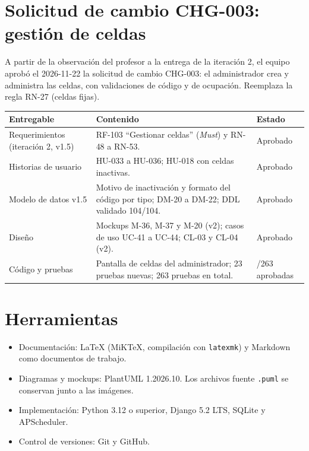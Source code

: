 \section{Solicitud de cambio CHG-003: gestión de celdas}
A partir de la observación del profesor a la entrega de la iteración 2, el equipo aprobó el 2026-11-22 la solicitud de cambio CHG-003: el administrador crea y administra las celdas, con validaciones de código y de ocupación. Reemplaza la regla RN-27 (celdas fijas).
\begin{longtable}{>{\raggedright\arraybackslash}p{5.2cm}>{\raggedright\arraybackslash}p{6.6cm}>{\raggedright\arraybackslash}p{2.6cm}}
\toprule
\textbf{Entregable} & \textbf{Contenido} & \textbf{Estado}\\
\midrule\endhead
Requerimientos (iteración 2, v1.5) & RF-103 ``Gestionar celdas'' (\textit{Must}) y RN-48 a RN-53. & Aprobado\\
Historias de usuario & HU-033 a HU-036; HU-018 con celdas inactivas. & Aprobado\\
Modelo de datos v1.5 & Motivo de inactivación y formato del código por tipo; DM-20 a DM-22; DDL validado 104/104. & Aprobado\\
Diseño & Mockups M-36, M-37 y M-20 (v2); casos de uso UC-41 a UC-44; CL-03 y CL-04 (v2). & Aprobado\\
Código y pruebas & Pantalla de celdas del administrador; 23 pruebas nuevas; 263 pruebas en total. & 263/263 aprobadas\\
\bottomrule
\end{longtable}

\section{Herramientas}
\begin{itemize}
  \item Documentación: \LaTeX{} (MiKTeX, compilación con \texttt{latexmk}) y Markdown como documentos de trabajo.
  \item Diagramas y mockups: PlantUML 1.2026.10. Los archivos fuente \texttt{.puml} se conservan junto a las imágenes.
  \item Implementación: Python 3.12 o superior, Django 5.2 LTS, SQLite y APScheduler.
  \item Control de versiones: Git y GitHub.
\end{itemize}
